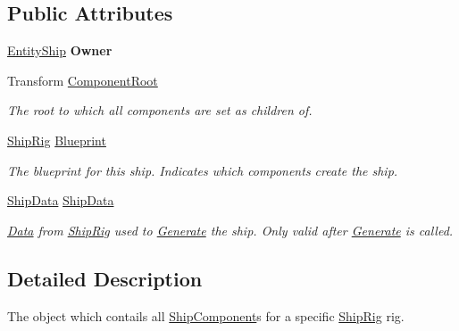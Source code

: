 \subsection*{Public Attributes}
\begin{DoxyCompactItemize}
\item 
\hypertarget{class_skyrates_1_1_ship_1_1_ship_generator_ad89f21e6db936673952fd7cc8ff3f06e}{\hyperlink{class_skyrates_1_1_entity_1_1_entity_ship}{Entity\-Ship} {\bfseries Owner}}\label{class_skyrates_1_1_ship_1_1_ship_generator_ad89f21e6db936673952fd7cc8ff3f06e}

\item 
Transform \hyperlink{class_skyrates_1_1_ship_1_1_ship_generator_a040b9432f06173ddce445b14fdd42c9a}{Component\-Root}
\begin{DoxyCompactList}\small\item\em The root to which all components are set as children of. \end{DoxyCompactList}\item 
\hyperlink{class_skyrates_1_1_ship_1_1_ship_rig}{Ship\-Rig} \hyperlink{class_skyrates_1_1_ship_1_1_ship_generator_a97b0d9ba683bd4ea383f01ef96348d5a}{Blueprint}
\begin{DoxyCompactList}\small\item\em The blueprint for this ship. Indicates which components create the ship. \end{DoxyCompactList}\item 
\hyperlink{class_skyrates_1_1_ship_1_1_ship_data}{Ship\-Data} \hyperlink{class_skyrates_1_1_ship_1_1_ship_generator_ad8e9cf776a0b91cf123a9faa0c13cedf}{Ship\-Data}
\begin{DoxyCompactList}\small\item\em \hyperlink{namespace_skyrates_1_1_data}{Data} from \hyperlink{class_skyrates_1_1_ship_1_1_ship_rig}{Ship\-Rig} used to \hyperlink{class_skyrates_1_1_ship_1_1_ship_generator_a98648e2db2bd204cd7a470df9f8745d5}{Generate} the ship. Only valid after \hyperlink{class_skyrates_1_1_ship_1_1_ship_generator_a98648e2db2bd204cd7a470df9f8745d5}{Generate} is called. \end{DoxyCompactList}\end{DoxyCompactItemize}


\subsection{Detailed Description}
The object which contails all \hyperlink{class_skyrates_1_1_ship_1_1_ship_component}{Ship\-Component}s for a specific \hyperlink{class_skyrates_1_1_ship_1_1_ship_rig}{Ship\-Rig} rig. 



